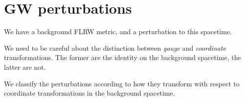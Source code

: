 \documentclass[main.tex]{subfiles}
\begin{document}
\section{GW perturbations}


We have a background FLRW metric, and a perturbation to this spacetime. 

We need to be careful about the distinction between \emph{gauge} and \emph{coordinate} transformations. 
The former are the identity on the background spacetime, the latter are not. 

We classify the perturbations according to how they transform with respect to coordinate transformations in the background spacetime.
\end{document}

